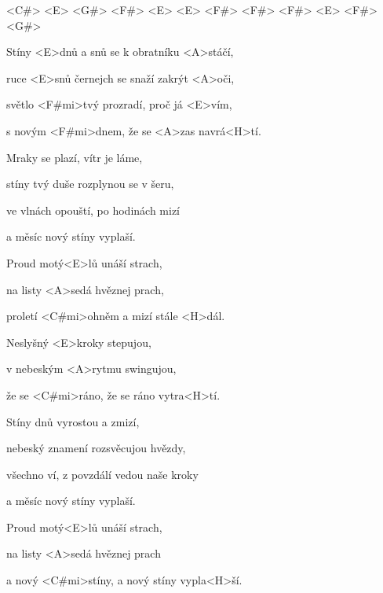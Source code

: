 

<C#> <E> <G#> <F#> <E> <E> <F#> <F#> <F#> <E> <F#> <G#>

\zs
Stíny <E>dnů a snů se k obratníku <A>stáčí,

ruce <E>snů černejch se snaží zakrýt <A>oči,

světlo <F#mi>tvý prozradí, proč já <E>vím,

s novým <F#mi>dnem, že se <A>zas navrá<H>tí.
\ks

\zs
Mraky se plazí, vítr je láme,

stíny tvý duše rozplynou se v šeru,

ve vlnách opouští, po hodinách mizí

a měsíc nový stíny vyplaší.
\ks

\zr
Proud motý<E>lů unáší strach,

na listy <A>sedá hvěznej prach,

proletí <C#mi>ohněm a mizí stále <H>dál.

Neslyšný <E>kroky stepujou,

v nebeským <A>rytmu swingujou,

že se <C#mi>ráno, že se ráno vytra<H>tí.
\kr

\zs
Stíny dnů vyrostou a zmizí,

nebeský znamení rozsvěcujou hvězdy,

všechno ví, z povzdálí vedou naše kroky

a měsíc nový stíny vyplaší.
\ks

\zr \kr

\zr
Proud motý<E>lů unáší strach,

na listy <A>sedá hvěznej prach

a nový <C#mi>stíny, a nový stíny vypla<H>ší.
\kr

\kp
